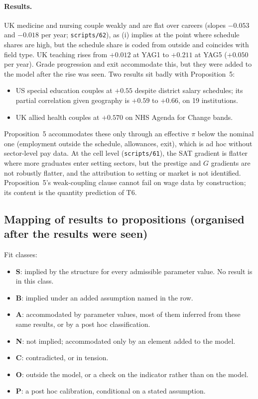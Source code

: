 \paragraph{Results.} UK medicine and nursing couple weakly and are flat over careers (slopes $-0.053$ and $-0.018$
per year; \texttt{scripts/62}), as (i) implies at the point where schedule shares are high, but the schedule share
is coded from outside and coincides with field type. UK teaching rises from $+0.012$ at YAG1 to $+0.211$ at YAG5
($+0.050$ per year). Grade progression and exit accommodate this, but they were added to the model after the rise
was seen. Two results sit badly with Proposition~5:
\begin{itemize}
\item US special education couples at $+0.55$ despite district salary schedules; its partial correlation given
geography is $+0.59$ to $+0.66$, on 19 institutions.
\item UK allied health couples at $+0.570$ on NHS Agenda for Change bands.
\end{itemize}
Proposition~5 accommodates these only through an effective $\pi$ below the nominal one (employment outside the
schedule, allowances, exit), which is ad hoc without sector-level pay data. At the cell level
(\texttt{scripts/61}), the SAT gradient is flatter where more graduates enter setting sectors, but the prestige and
$G$ gradients are not robustly flatter, and the attribution to setting or market is not identified.
Proposition~5's weak-coupling clause cannot fail on wage data by construction; its content is the quantity
prediction of T6.

\subsection{Mapping of results to propositions (organised after the results were seen)}\label{si:theory:map}

Fit classes:
\begin{itemize}
\item \textbf{S}: implied by the structure for every admissible parameter value. No result is in this class.
\item \textbf{B}: implied under an added assumption named in the row.
\item \textbf{A}: accommodated by parameter values, most of them inferred from these same results, or by a post hoc
classification.
\item \textbf{N}: not implied; accommodated only by an element added to the model.
\item \textbf{C}: contradicted, or in tension.
\item \textbf{O}: outside the model, or a check on the indicator rather than on the model.
\item \textbf{P}: a post hoc calibration, conditional on a stated assumption.
\end{itemize}

